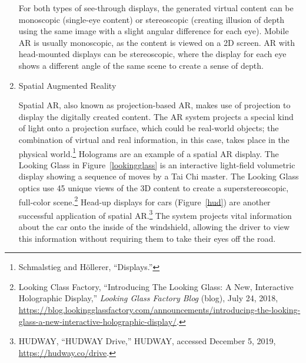 \begin{enumerate}
For both types of see-through displays, the generated virtual content can be monoscopic (single-eye content) or stereoscopic (creating illusion of depth using the same image with a slight angular difference for each eye). Mobile AR is usually monoscopic, as the content is viewed on a 2D screen. AR with head-mounted displays can be stereoscopic, where the display for each eye shows a different angle of the same scene to create a sense of depth.

\item{Spatial Augmented Reality}

\begin{figure}[!ht]
\end{figure}

Spatial AR, also known as projection-based AR, makes use of projection to display the digitally created content. The AR system projects a special kind of light onto a projection surface, which could be real-world objects; the combination of virtual and real information, in this case, takes place in the physical world.\footnote{Schmalstieg and Höllerer, “Displays.”} Holograms are an example of a spatial AR display. The Looking Glass in Figure~\ref{lookingglass} is an interactive light-field volumetric display showing a sequence of moves by a Tai Chi master. The Looking Glass optics use 45 unique views of the 3D content to create a superstereoscopic, full-color scene.\footnote{Looking Class Factory, “Introducing The Looking Glass: A New, Interactive Holographic Display,” \textit{Looking Glass Factory Blog} (blog), July 24, 2018, \url{https://blog.lookingglassfactory.com/announcements/introducing-the-looking-glass-a-new-interactive-holographic-display/}.} Head-up displays for cars (Figure~\ref{hud}) are another successful application of spatial AR.\footnote{HUDWAY, “HUDWAY Drive,” HUDWAY, accessed December 5, 2019, \url{https://hudway.co/drive}.} The system projects vital information about the car onto the inside of the windshield, allowing the driver to view this information without requiring them to take their eyes off the road.


\end{enumerate}
